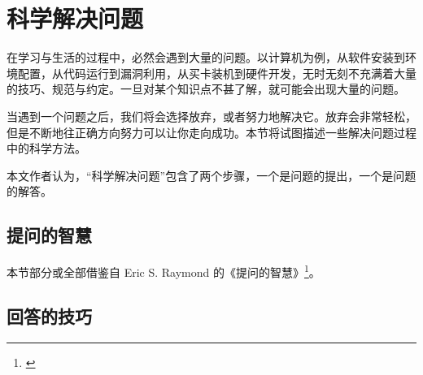 \section{科学解决问题}\label{sec:solving}
    在学习与生活的过程中，必然会遇到大量的问题。以计算机为例，从软件安装到环境配置，从代码运行到漏洞利用，从买卡装机到硬件开发，无时无刻不充满着大量的技巧、规范与约定。一旦对某个知识点不甚了解，就可能会出现大量的问题。

    当遇到一个问题之后，我们将会选择放弃，或者努力地解决它。放弃会非常轻松，但是不断地往正确方向努力可以让你走向成功。本节将试图描述一些解决问题过程中的科学方法。

    本文作者认为，“科学解决问题”包含了两个步骤，一个是问题的提出，一个是问题的解答。

    \subsection{提问的智慧}\label{subsec:solving/asking}
        本节部分或全部借鉴自 Eric S. Raymond 的《提问的智慧》\footnote{\cite{esr}}。


    \subsection{回答的技巧}\label{subsec:solving/answering}
